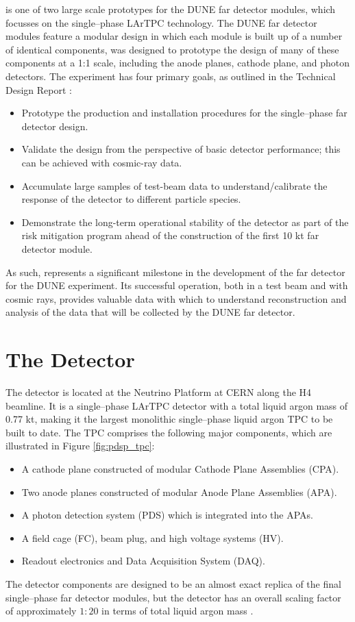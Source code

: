 \protodune{} is one of two large scale prototypes for the DUNE far detector
modules, which focusses on the single--phase LArTPC technology. The DUNE far
detector modules feature a modular design in which each module is built up of a
number of identical components, \protodune{} was designed to prototype the
design of many of these components at a 1:1 scale, including the anode planes,
cathode plane, and photon detectors. The \protodune{} experiment has four 
primary goals, as outlined in the Technical Design Report \cite{Abi2017}:
\begin{itemize}
	\item Prototype the production and installation procedures for the
		single--phase far detector design.
	\item Validate the design from the perspective of basic detector performance;
		this can be achieved with cosmic-ray data. 
	\item Accumulate large samples of test-beam data to understand/calibrate the
		response of the detector to different particle species.
	\item Demonstrate the long-term operational stability of the detector as part
		of the risk mitigation program ahead of the construction of the first 10 kt
		far detector module.
\end{itemize}
As such, \protodune{} represents a significant milestone in the development of
the far detector for the DUNE experiment. Its successful operation, both in a 
test beam and with cosmic rays, provides valuable data with which to understand
reconstruction and analysis of the data that will be collected by the DUNE far 
detector.

\section{The \protodune{} Detector} \label{sec:pdsp_detector}

The \protodune{} detector is located at the Neutrino Platform at CERN along the
H4 beamline. It is a single--phase LArTPC detector with a total liquid argon 
mass of 0.77 kt, making it the largest monolithic single--phase liquid argon TPC
to be built to date. The TPC comprises the following major components, which 
are illustrated in Figure \ref{fig:pdsp_tpc}:
\begin{itemize}
	\item A cathode plane constructed of modular Cathode Plane Assemblies (CPA).
	\item Two anode planes constructed of modular Anode Plane Assemblies (APA).
	\item A photon detection system (PDS) which is integrated into the APAs.
	\item A field cage (FC), beam plug, and high voltage systems (HV).
	\item Readout electronics and Data Acquisition System (DAQ).
\end{itemize}
The detector components are designed to be an almost exact replica of the final 
single--phase far detector modules, but the detector has an overall scaling 
factor of approximately $1:20$ in terms of total liquid argon mass 
\cite{Abi2017}.

